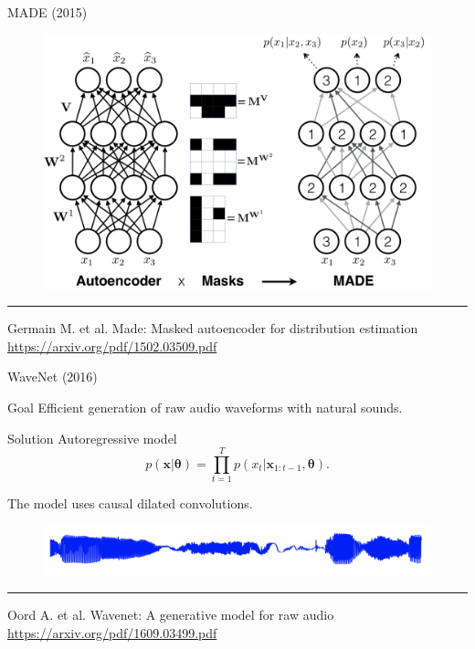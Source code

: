 \documentclass{beamer}
\newcommand{\bx}{\mathbf{x}}
\newcommand{\btheta}{\boldsymbol{\theta}}
\begin{document}
\begin{frame}{MADE (2015)}
\begin{figure}
    \centering
    \includegraphics[width=0.9\linewidth]{figs/made.png}
    \label{fig:made}
\end{figure}
\vfill
\hrule\medskip
{\scriptsize Germain M. et al. Made: Masked autoencoder for distribution estimation \href{https://arxiv.org/pdf/1502.03509.pdf}{https://arxiv.org/pdf/1502.03509.pdf}}
\end{frame}
\begin{frame}{WaveNet (2016)}
\begin{block}{Goal}
Efficient generation of raw audio waveforms with natural sounds.
\end{block}
\begin{block}{Solution}
Autoregressive model
\[
    p(\bx| \btheta) = \prod_{t=1}^T p(x_t|\bx_{1:t-1}, \btheta).
\]
\end{block}
The model uses causal dilated convolutions.
\begin{figure}
    \centering
    \includegraphics[width=0.9\linewidth]{figs/wavenet_ex.png}
\end{figure}
\vfill
\hrule\medskip
{\scriptsize Oord A. et al. Wavenet: A generative model for raw audio \href{https://arxiv.org/pdf/1609.03499.pdf}{https://arxiv.org/pdf/1609.03499.pdf}}
\end{frame}
\end{document}
